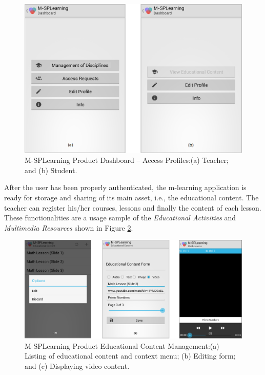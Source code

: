 \begin{figure}
\centering
\includegraphics[scale=0.34]{figures/section3/MSPLDashboardApp}
\caption{M-SPLearning Product Dashboard -- Access Profiles:\newline(a) Teacher; and (b) Student.}
\label{figureMSPLDashboardApp}
\end{figure}

After the user has been properly authenticated, the m-learning application is ready for storage and sharing of its main asset, i.e., the educational content. The teacher can register his/her courses, lessons and finally the content of each lesson. These functionalities are a usage sample of the \textit{Educational Activities} and \textit{Multimedia Resources} shown in Figure \ref{figureMSPLEducationalContent}.

\begin{figure}
\centering
\includegraphics[scale=0.34]{figures/section3/MSPLEducationalContent}
\caption{M-SPLearning Product Educational Content Management:\newline(a) Listing of educational content and context menu; (b) Editing form; and (c) Displaying video content.}
\label{figureMSPLEducationalContent}
\end{figure}

